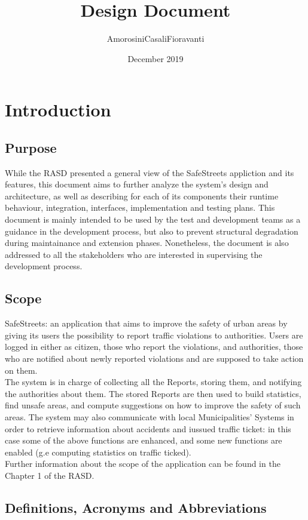 \documentclass{report}
\title{Design Document}
\author{AmorosiniCasaliFioravanti}
\date{December 2019}
\begin{document}


\chapter{Introduction}
\section{Purpose}
While the RASD presented a general view of the SafeStreets appliction and its features, this document aims to further analyze the system's design and architecture, as well as describing for each of its components their runtime behaviour, integration, interfaces, implementation and testing plans.
This document is mainly intended to be used by the test and development teams as a guidance in the development process, but also to prevent structural degradation during maintainance and extension phases. Nonetheless, the document is also addressed to all the stakeholders who are interested in supervising the development process.

\section{Scope}
SafeStreets: an application that aims to improve the safety of urban areas by giving its users the possibility to report traffic violations to authorities. Users are logged in either as citizen, those who report the violations, and authorities, those who are notified about newly reported violations and are supposed to take action on them.\\
The system is in charge of collecting all the Reports, storing them, and notifying the authorities about them. The stored Reports are then used to build statistics, find unsafe areas, and compute suggestions on how to improve the safety of such areas. The system may also communicate with local Municipalities' Systems in order to retrieve information about accidents and iussued traffic ticket: in this case some of the above functions are enhanced, and some new functions are enabled (g.e computing statistics on traffic ticked).\\
\newline
Further information about the scope of the application can be found in the Chapter 1 of the RASD.

\section{Definitions, Acronyms and Abbreviations}
\end{document}
